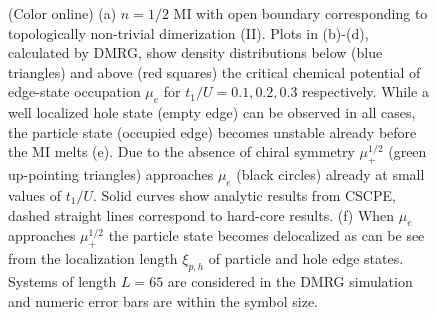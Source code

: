 \documentclass[pra,aps,twocolumn,showpacs]{revtex4}
\begin{document}
\begin{figure}[hbt]
 \centering
 \caption{(Color online) (a) $n=1/2$ MI with open boundary corresponding to
topologically non-trivial dimerization (II). Plots in (b)-(d), calculated by DMRG, show 
density distributions below (blue triangles) and above (red squares) the critical chemical 
potential of edge-state occupation $\mu_e$ for $t_1/U=0.1, 0.2, 0.3$ respectively. 
While a well localized hole state (empty edge) can be observed in all cases, the 
particle state (occupied edge) becomes unstable already before the MI melts (e). Due to the absence of chiral
symmetry $\mu_+^{1/2}$ (green up-pointing triangles) approaches $\mu_e$ (black circles) already at small
values of $t_1/U$.  Solid curves show analytic results from CSCPE, dashed straight lines correspond to hard-core
results. (f) When $\mu_e$ approaches $\mu_+^{1/2}$ the particle state becomes delocalized as can be see from the 
localization length $\xi_{p,h}$ of particle and hole edge states. Systems of length $L=65$ are considered in the 
DMRG simulation and numeric error bars are within the symbol size.
} 
 \label{fig:edge-states}
\end{figure}
\end{document}
